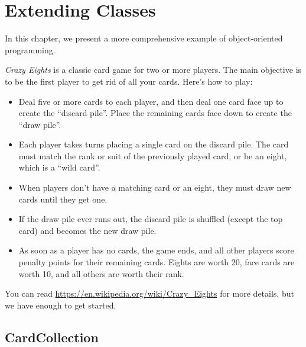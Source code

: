 \chapter{Extending Classes}
\label{eights}


In this chapter, we present a more comprehensive example of object-oriented programming.

{\it Crazy Eights} is a classic card game for two or more players.
The main objective is to be the first player to get rid of all your cards.
Here's how to play:

\begin{itemize}

\item Deal five or more cards to each player, and then deal one card face up to create the ``discard pile''.
Place the remaining cards face down to create the ``draw pile''.

\item Each player takes turns placing a single card on the discard pile.
The card must match the rank or suit of the previously played card, or be an eight, which is a ``wild card''.

\item When players don't have a matching card or an eight, they must draw new cards until they get one.

\item If the draw pile ever runs out, the discard pile is shuffled (except the top card) and becomes the new draw pile.

\item As soon as a player has no cards, the game ends, and all other players score penalty points for their remaining cards.
Eights are worth 20, face cards are worth 10, and all others are worth their rank.

\end{itemize}

You can read \url{https://en.wikipedia.org/wiki/Crazy_Eights} for more details, but we have enough to get started.



\section{CardCollection}


